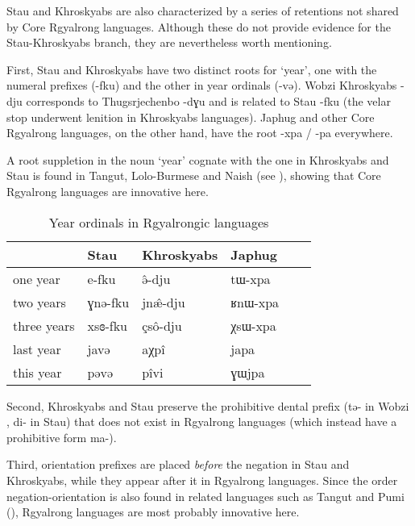 \documentclass[oneside,a4paper,11pt]{article}
\newcommand{\ipa}[1]{{\phon #1}} %
\begin{document}
Stau and Khroskyabs are also characterized by a series of retentions not shared by Core Rgyalrong languages. Although these do not provide evidence for the Stau-Khroskyabs branch, they are nevertheless worth mentioning.

First, Stau and Khroskyabs have two distinct roots for `year', one with the numeral prefixes (\ipa{-fku}) and the other in year ordinals (\ipa{-və}). Wobzi Khroskyabs \ipa{-dju} corresponds to Thugsrjechenbo \ipa{-dɣu} and is related to Stau \ipa{-fku} (the velar stop underwent lenition in Khroskyabs languages). Japhug and other Core Rgyalrong languages, on the other hand, have the root \ipa{-xpa} / \ipa{-pa} everywhere. 

A root suppletion in the noun `year' cognate with the one in Khroskyabs and Stau is found in Tangut, Lolo-Burmese and Naish (see \citealt{jacques.michaud11naish}), showing that Core Rgyalrong languages are innovative here.

  \begin{table}[H]
  \caption{Year ordinals in Rgyalrongic languages} \label{tab:year} \centering
 \begin{tabular}{llllll}
 \toprule
 & 	Stau & 	Khroskyabs & 	Japhug & 	\\	
 \midrule
one year & 	\ipa{e-fku} & 	\ipa{ə̂-dju } & 	\ipa{tɯ-xpa} & 	\\	
two years & 	\ipa{ɣnə-fku} & 	\ipa{jnæ̂-dju } & 	\ipa{ʁnɯ-xpa} & 	\\	
three years & 	\ipa{xsɞ-fku} & 	\ipa{çsô-dju } & 	\ipa{χsɯ-xpa} & 	\\	
 \midrule
last year & 	\ipa{javə} & 	\ipa{aχpî} & 	\ipa{japa} & 	\\	
this year & 	\ipa{pəvə} & 	\ipa{pîvi} & 	\ipa{ɣɯjpa} & 	\\	
\bottomrule
\end{tabular}
\end{table}


Second, Khroskyabs and Stau preserve the prohibitive dental prefix (\ipa{tə-} in Wobzi \citealt[130-1]{lai13affixale}, \ipa{di-} in Stau) that does not exist in Rgyalrong languages (which instead have a prohibitive form \ipa{ma-}).

Third, orientation prefixes are placed \textit{before} the negation in Stau and Khroskyabs, while they appear after it in Rgyalrong languages. Since the order negation-orientation is also found in related languages such as Tangut and Pumi (\citealt{jacques11tangut.verb}), Rgyalrong languages are most probably innovative here.
\end{document}
